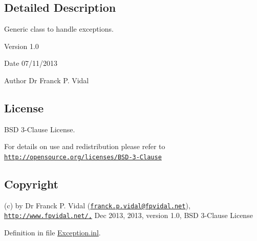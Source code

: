 \subsection{Detailed Description}
Generic class to handle exceptions. \begin{DoxyVersion}{Version}
1.0
\end{DoxyVersion}
\begin{DoxyDate}{Date}
07/11/2013
\end{DoxyDate}
\begin{DoxyAuthor}{Author}
Dr Franck P. Vidal
\end{DoxyAuthor}
\hypertarget{_x_ray_renderer_8inl_License}{}\subsection{License}\label{_x_ray_renderer_8inl_License}
BSD 3-\/Clause License.

For details on use and redistribution please refer to \href{http://opensource.org/licenses/BSD-3-Clause}{\tt http://opensource.org/licenses/BSD-\/3-\/Clause}\hypertarget{_x_ray_renderer_8inl_Copyright}{}\subsection{Copyright}\label{_x_ray_renderer_8inl_Copyright}
(c) by Dr Franck P. Vidal (\href{mailto:franck.p.vidal@fpvidal.net}{\tt franck.p.vidal@fpvidal.net}), \href{http://www.fpvidal.net/,}{\tt http://www.fpvidal.net/,} Dec 2013, 2013, version 1.0, BSD 3-\/Clause License 

Definition in file \hyperlink{_exception_8inl_source}{Exception.inl}.

